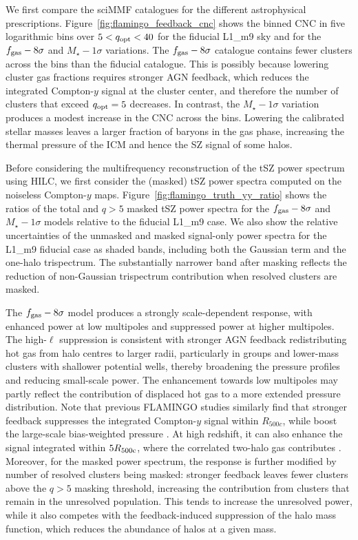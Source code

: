 \documentclass[aps,prd,twocolumn,superscriptaddress,nofootinbib,floatfix]{revtex4-2}
\begin{document}
We first compare the sciMMF catalogues for the different astrophysical prescriptions. Figure~\ref{fig:flamingo_feedback_cnc} shows the binned CNC in five logarithmic bins over $5<q_{\rm opt}<40$ for the fiducial L1\_m9 sky and for the $f_{\rm gas}-8\sigma$ and $M_\star-1\sigma$ variations. The $f_{\rm gas}-8\sigma$ catalogue contains fewer clusters across the bins than the fiducial catalogue. This is possibly because lowering cluster gas fractions requires stronger AGN feedback, which reduces the integrated Compton-$y$ signal at the cluster center, and therefore the number of clusters that exceed $q_{\rm opt}=5$ decreases. In contrast, the $M_\star-1\sigma$ variation produces a modest increase in the CNC across the bins. Lowering the calibrated stellar masses leaves a larger fraction of baryons in the gas phase, increasing the thermal pressure of the ICM and hence the SZ signal of some halos.

Before considering the multifrequency reconstruction of the tSZ power spectrum using HILC, we first consider the (masked) tSZ power spectra computed on the noiseless Compton-$y$ maps. Figure~\ref{fig:flamingo_truth_yy_ratio} shows the ratios of the total and $q>5$ masked tSZ power spectra for the $f_{\rm gas}-8\sigma$ and $M_\star-1\sigma$ models relative to the fiducial L1\_m9 case. We also show the relative uncertainties of the unmasked and masked signal-only power spectra for the L1\_m9 fiducial case as shaded bands, including both the Gaussian term and the one-halo trispectrum. The substantially narrower band after masking reflects the reduction of non-Gaussian trispectrum contribution when resolved clusters are masked.

The $f_{\rm gas}-8\sigma$ model produces a strongly scale-dependent response, with enhanced power at low multipoles and suppressed power at higher multipoles. The high-$\ell$ suppression is consistent with stronger AGN feedback redistributing hot gas from halo centres to larger radii, particularly in groups and lower-mass clusters with shallower potential wells, thereby broadening the pressure profiles and reducing small-scale power. The enhancement towards low multipoles may partly reflect the contribution of displaced hot gas to a more extended pressure distribution. Note that previous FLAMINGO studies similarly find that stronger feedback suppresses the integrated Compton-$y$ signal within $R_{500c}$, while boost the large-scale bias-weighted pressure \citep{Braspenning2024}. At high redshift, it can also enhance the signal integrated within $5R_{\rm 500c}$, where the correlated two-halo gas contributes \citep{Salcido2026}. Moreover, for the masked power spectrum, the response is further modified by number of resolved clusters being masked: stronger feedback leaves fewer clusters above the $q>5$ masking threshold, increasing the contribution from clusters that remain in the unresolved population. This tends to increase the unresolved power, while it also competes with the feedback-induced suppression of the halo mass function, which reduces the abundance of halos at a given mass.
\end{document}

